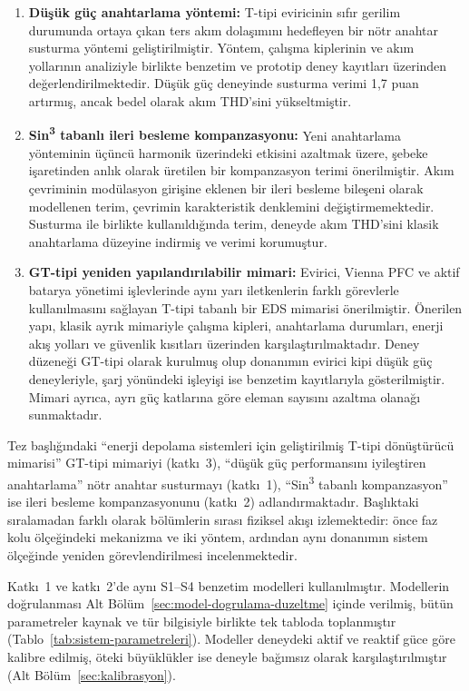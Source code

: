 \begin{enumerate}
  \item \textbf{Düşük güç anahtarlama yöntemi:} T-tipi eviricinin sıfır gerilim durumunda ortaya çıkan ters akım dolaşımını hedefleyen bir nötr anahtar susturma yöntemi geliştirilmiştir. Yöntem, çalışma kiplerinin ve akım yollarının analiziyle birlikte benzetim ve prototip deney kayıtları üzerinden değerlendirilmektedir. Düşük güç deneyinde susturma verimi 1,7 puan artırmış, ancak bedel olarak akım THD'sini yükseltmiştir.
  \item \textbf{Sin\textsuperscript{3} tabanlı ileri besleme kompanzasyonu:} Yeni anahtarlama yönteminin üçüncü harmonik üzerindeki etkisini azaltmak üzere, şebeke işaretinden anlık olarak üretilen bir kompanzasyon terimi önerilmiştir. Akım çevriminin modülasyon girişine eklenen bir ileri besleme bileşeni olarak modellenen terim, çevrimin karakteristik denklemini değiştirmemektedir. Susturma ile birlikte kullanıldığında terim, deneyde akım THD'sini klasik anahtarlama düzeyine indirmiş ve verimi korumuştur.
  \item \textbf{GT-tipi yeniden yapılandırılabilir mimari:} Evirici, Vienna PFC ve aktif batarya yönetimi işlevlerinde aynı yarı iletkenlerin farklı görevlerle kullanılmasını sağlayan T-tipi tabanlı bir EDS mimarisi önerilmiştir. Önerilen yapı, klasik ayrık mimariyle çalışma kipleri, anahtarlama durumları, enerji akış yolları ve güvenlik kısıtları üzerinden karşılaştırılmaktadır. Deney düzeneği GT-tipi olarak kurulmuş olup donanımın evirici kipi düşük güç deneyleriyle, şarj yönündeki işleyişi ise benzetim kayıtlarıyla gösterilmiştir. Mimari ayrıca, ayrı güç katlarına göre eleman sayısını azaltma olanağı sunmaktadır.
\end{enumerate}

Tez başlığındaki ``enerji depolama sistemleri için geliştirilmiş T-tipi dönüştürücü mimarisi'' GT-tipi mimariyi (katkı~3), ``düşük güç performansını iyileştiren anahtarlama'' nötr anahtar susturmayı (katkı~1), ``Sin\textsuperscript{3} tabanlı kompanzasyon'' ise ileri besleme kompanzasyonunu (katkı~2) adlandırmaktadır. Başlıktaki sıralamadan farklı olarak bölümlerin sırası fiziksel akışı izlemektedir: önce faz kolu ölçeğindeki mekanizma ve iki yöntem, ardından aynı donanımın sistem ölçeğinde yeniden görevlendirilmesi incelenmektedir.

Katkı~1 ve katkı~2'de aynı S1--S4 benzetim modelleri kullanılmıştır. Modellerin doğrulanması Alt Bölüm~\ref{sec:model-dogrulama-duzeltme} içinde verilmiş, bütün parametreler kaynak ve tür bilgisiyle birlikte tek tabloda toplanmıştır (Tablo~\ref{tab:sistem-parametreleri}). Modeller deneydeki aktif ve reaktif güce göre kalibre edilmiş, öteki büyüklükler ise deneyle bağımsız olarak karşılaştırılmıştır (Alt Bölüm~\ref{sec:kalibrasyon}).

